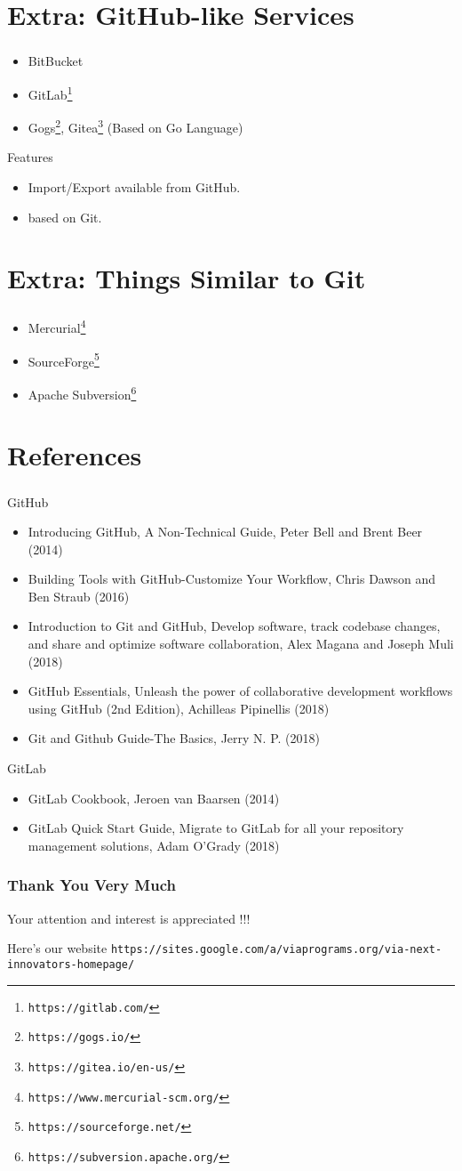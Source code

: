 \documentclass[dvipdfmx,10pt]{beamer}
\newcommand{\bb}{\begin{block}}
\newcommand{\eb}{\end{block}}
\newcommand{\ft}{\frametitle}
\newcommand{\bit}{\begin{itemize}}
\newcommand{\eit}{\end{itemize}}
\begin{document}
\section{Extra: GitHub-like Services}
\begin{frame}\ft{\insertsection}
\bit
\item BitBucket
\item GitLab\footnote{\texttt{https://gitlab.com/}}
\item Gogs\footnote{\texttt{https://gogs.io/}}, Gitea\footnote{\texttt{https://gitea.io/en-us/}} (Based on Go Language)
\eit
\bb{Features}
\bit
\item Import/Export available from GitHub.
\item based on Git.
\eit
\eb
\end{frame}
\section{Extra: Things Similar to Git}
\begin{frame}\ft{\insertsection}
\bit
\item Mercurial\footnote{\texttt{https://www.mercurial-scm.org/}}
\item SourceForge\footnote{\texttt{https://sourceforge.net/}}
\item Apache Subversion\footnote{\texttt{https://subversion.apache.org/}}
\eit
\end{frame}
\section{References}
\begin{frame}\ft{\insertsection}
\footnotesize
\bb{GitHub}
\bit
\item Introducing GitHub, A Non-Technical Guide, Peter Bell and Brent Beer (2014)
\item Building Tools with GitHub-Customize Your Workflow, Chris Dawson and Ben Straub (2016)
\item Introduction to Git and GitHub, Develop software, track codebase changes, and share and optimize software collaboration, Alex Magana and Joseph Muli (2018)
\item GitHub Essentials, Unleash the power of collaborative development workflows using GitHub (2nd Edition), Achilleas Pipinellis (2018)
\item Git and Github Guide-The Basics, Jerry N. P. (2018)
\eit
\eb
\bb{GitLab}
\bit
\item GitLab Cookbook, Jeroen van Baarsen (2014)
\item GitLab Quick Start Guide, Migrate to GitLab for all your repository management solutions, Adam O'Grady (2018)
\eit
\eb
\normalsize
\end{frame}
\begin{frame}\ft{Thank You Very Much}
Your attention and interest is appreciated !!!
\bb{Here's our website}
\footnotesize
\texttt{https://sites.google.com/a/viaprograms.org/via-next-innovators-homepage/}
\normalsize
\eb
\end{frame}
\end{document}
